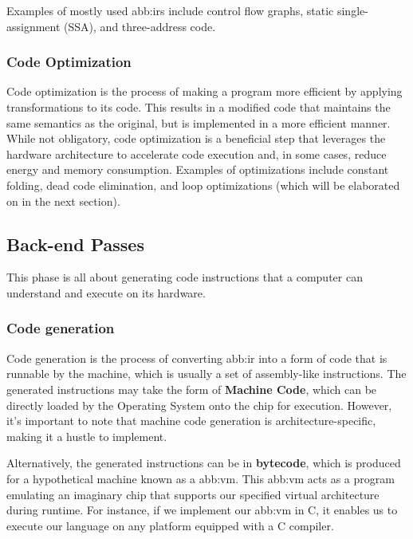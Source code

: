             Examples of mostly used \gls{abb:ir}s include control flow graphs, static single-assignment (SSA), and three-address code.

        \subsubsection{Code Optimization}

            Code optimization is the process of making a program more efficient by applying transformations to its code. This results in a modified code that maintains the same semantics as the original, but is implemented in a more efficient manner. While not obligatory,  code optimization is a beneficial step that leverages the hardware architecture to accelerate code execution and, in some cases, reduce energy and memory consumption. Examples of optimizations include constant folding, dead code elimination, and loop optimizations (which will be elaborated on in the next section).

    \subsection{Back-end Passes}
        This phase is all about generating code instructions that a computer can understand and execute on its hardware.

        \subsubsection{Code generation}
            Code generation is the process of converting \gls{abb:ir} into a form of code that is runnable by the machine, which is usually a set of assembly-like instructions. The generated instructions may take the form of \textbf{Machine Code}, which can be directly loaded by the Operating System onto the chip for execution. However, it's important to note that machine code generation is architecture-specific, making it a hustle to implement.

            Alternatively, the generated instructions can be in \textbf{bytecode}, which is produced for a hypothetical machine known as a \gls{abb:vm}. This \gls{abb:vm} acts as a program emulating an imaginary chip that supports our specified virtual architecture during runtime. For instance, if we implement our \gls{abb:vm} in C, it enables us to execute our language on any platform equipped with a C compiler.
